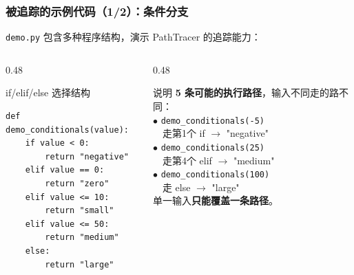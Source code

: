 \documentclass[presentation,aspectratio=169,fontset=none]{ctexbeamer}
\begin{document}
\begin{frame}[fragile]
\frametitle{被追踪的示例代码（1/2）：条件分支}
{\footnotesize \texttt{demo.py} 包含多种程序结构，演示 PathTracer 的追踪能力：}

\vspace{0.1cm}
\begin{columns}[T]
\begin{column}{0.48\textwidth}
\begin{block}{\scriptsize if/elif/else 选择结构}
{\scriptsize
\begin{verbatim}
def demo_conditionals(value):
    if value < 0:
        return "negative"
    elif value == 0:
        return "zero"
    elif value <= 10:
        return "small"
    elif value <= 50:
        return "medium"
    else:
        return "large"
\end{verbatim}}
\end{block}
\end{column}
\begin{column}{0.48\textwidth}
\begin{block}{\scriptsize 说明}
{\scriptsize
\textbf{5 条可能的执行路径}，输入不同走的路不同：\\[3pt]
$\bullet$ \texttt{demo\_conditionals(-5)}\\
~~走第1个 if $\rightarrow$ "negative"\\[2pt]
$\bullet$ \texttt{demo\_conditionals(25)}\\
~~走第4个 elif $\rightarrow$ "medium"\\[2pt]
$\bullet$ \texttt{demo\_conditionals(100)}\\
~~走 else $\rightarrow$ "large"\\[3pt]
单一输入\textbf{只能覆盖一条路径}。}
\end{block}
\end{column}
\end{columns}
\end{frame}

\end{document}
